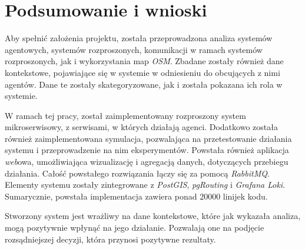 \chapter{Podsumowanie i wnioski}

\par Aby spełnić założenia projektu, została przeprowadzona analiza systemów agentowych, systemów rozproszonych, komunikacji w ramach systemów rozproszonych, jak i wykorzystania map \emph{OSM}. Zbadane zostały również dane kontekstowe, pojawiające się w systemie w odniesieniu do obcujących z nimi agentów. Dane te zostały skategoryzowane, jak i została pokazana ich rola w systemie. 

\par W ramach tej pracy, został zaimplementowany rozproszony system mikroserwisowy, z serwisami, w których działają agenci. Dodatkowo została również zaimplementowana symulacja, pozwalająca na przetestowanie działania systemu i przeprowadzenie na nim eksperymentów. Powstała również aplikacja \emph{web}owa, umożliwiająca wizualizację i agregacją danych, dotyczących przebiegu działania. Całość powstałego rozwiązania łączy się za pomocą \emph{RabbitMQ}. Elementy systemu zostały zintegrowane z \emph{PostGIS}, \emph{pgRouting} i \emph{Grafana Loki}. Sumarycznie, powstała implementacja zawiera ponad $20000$ linijek kodu.

\par Stworzony system jest wrażliwy na dane kontekstowe, które jak wykazała analiza, mogą pozytywnie wpłynąć na jego działanie. Pozwalają one na podjęcie rozsądniejszej decyzji, która przynosi pozytywne rezultaty.